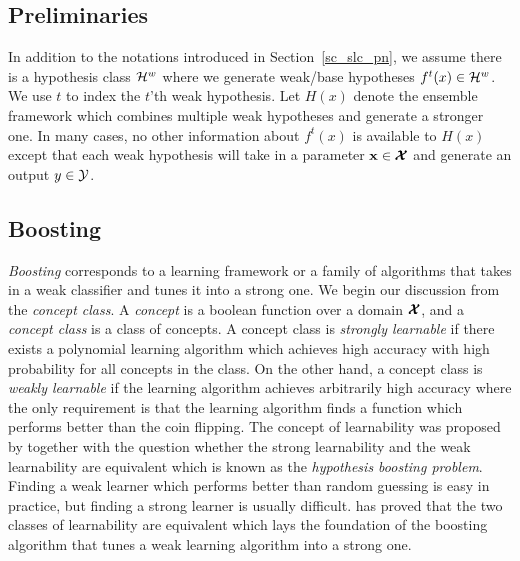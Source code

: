 {%
%
\subsection{Preliminaries} \label{sc_em_pn}

In addition to the notations introduced in Section~\ref{sc_slc_pn}, we assume there is a hypothesis class $\mathcal{H}^w$ where we generate weak/base hypotheses $f^t(x)\in\mathcal{H}^w$.
We use $t$ to index the $t$'th weak hypothesis.
Let $H(x)$ denote the ensemble framework which combines multiple weak hypotheses and generate a stronger one.
In many cases, no other information about $f^t(x)$ is available to $H(x)$ except that each weak hypothesis will take in a parameter $\mathbf {x}\in\pmb {\mathcal{X}}$ and generate an output $y\in\mathcal{Y}$.


\subsection{Boosting} \label{sc_boosting}

\textit{Boosting} corresponds to a learning framework or a family of algorithms that takes in a weak classifier and tunes it into a strong one.
We begin our discussion from the \textit{concept class}.
A \textit{concept} is a boolean function over a domain $\pmb {\mathcal{X}}$, and a \textit{concept class} is a class of concepts.
A concept class is \textit{strongly learnable} if there exists a polynomial learning algorithm which achieves high accuracy with high probability for all concepts in the class.
On the other hand, a concept class is \textit{weakly learnable} if the learning algorithm achieves arbitrarily high accuracy where the only requirement is that the learning algorithm finds a function which performs better than the coin flipping.
The concept of learnability was proposed by \citet{Kearns94cryptographic} together with the question whether the strong learnability and the weak learnability are equivalent which is known as the \textit{hypothesis boosting problem}.
Finding a weak learner which performs better than random guessing is easy in practice, but finding a strong learner is usually difficult.
\citet{Schapire90the} has proved that the two classes of learnability are equivalent which lays the foundation of the boosting algorithm that tunes a weak learning algorithm into a strong one.

}
